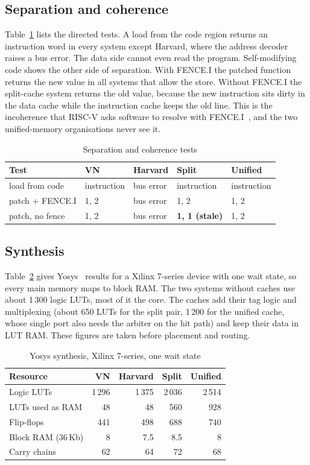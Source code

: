 \documentclass[conference]{IEEEtran}
\begin{document}
\subsection{Separation and coherence}
Table~\ref{tab:sep} lists the directed tests. A load from the code region returns an instruction word in every system except Harvard, where the address decoder raises a bus error. The data side cannot even read the program. Self-modifying code shows the other side of separation. With FENCE.I the patched function returns the new value in all systems that allow the store. Without FENCE.I the split-cache system returns the old value, because the new instruction sits dirty in the data cache while the instruction cache keeps the old line. This is the incoherence that RISC-V asks software to resolve with FENCE.I~\cite{riscv-spec}, and the two unified-memory organisations never see it.

\begin{table}[t]
\centering
\caption{Separation and coherence tests}
\label{tab:sep}
\footnotesize
\setlength{\tabcolsep}{3pt}
\begin{tabular}{@{}lllll@{}}
\toprule
Test & VN & Harvard & Split & Unified \\
\midrule
load from code & instruction & bus error & instruction & instruction \\
patch + FENCE.I & 1, 2 & bus error & 1, 2 & 1, 2 \\
patch, no fence & 1, 2 & bus error & \textbf{1, 1 (stale)} & 1, 2 \\
\bottomrule
\end{tabular}
\end{table}

\subsection{Synthesis}
Table~\ref{tab:synth} gives Yosys~\cite{yosys} results for a Xilinx 7-series device with one wait state, so every main memory maps to block RAM. The two systems without caches use about 1\,300 logic LUTs, most of it the core. The caches add their tag logic and multiplexing (about 650 LUTs for the split pair, 1\,200 for the unified cache, whose single port also needs the arbiter on the hit path) and keep their data in LUT RAM. These figures are taken before placement and routing.

\begin{table}[t]
\centering
\caption{Yosys synthesis, Xilinx 7-series, one wait state}
\label{tab:synth}
\footnotesize
\setlength{\tabcolsep}{3pt}
\begin{tabular}{@{}lrrrr@{}}
\toprule
Resource & VN & Harvard & Split & Unified \\
\midrule
Logic LUTs & 1\,296 & 1\,375 & 2\,036 & 2\,514 \\
LUTs used as RAM & 48 & 48 & 560 & 928 \\
Flip-flops & 441 & 498 & 688 & 740 \\
Block RAM (36\,Kb) & 8 & 7.5 & 8.5 & 8 \\
Carry chains & 62 & 64 & 72 & 68 \\
\bottomrule
\end{tabular}
\end{table}
\end{document}
